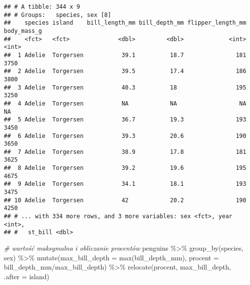 \documentclass[
]{book}
\newenvironment{Shaded}{\begin{snugshade}}{\end{snugshade}}
\newcommand{\AttributeTok}[1]{\textcolor[rgb]{0.77,0.63,0.00}{#1}}
\newcommand{\CommentTok}[1]{\textcolor[rgb]{0.56,0.35,0.01}{\textit{#1}}}
\newcommand{\FunctionTok}[1]{\textcolor[rgb]{0.00,0.00,0.00}{#1}}
\newcommand{\NormalTok}[1]{#1}
\newcommand{\SpecialCharTok}[1]{\textcolor[rgb]{0.00,0.00,0.00}{#1}}
\begin{document}
\begin{verbatim}
## # A tibble: 344 x 9
## # Groups:   species, sex [8]
##    species island    bill_length_mm bill_depth_mm flipper_length_mm body_mass_g
##    <fct>   <fct>              <dbl>         <dbl>             <int>       <int>
##  1 Adelie  Torgersen           39.1          18.7               181        3750
##  2 Adelie  Torgersen           39.5          17.4               186        3800
##  3 Adelie  Torgersen           40.3          18                 195        3250
##  4 Adelie  Torgersen           NA            NA                  NA          NA
##  5 Adelie  Torgersen           36.7          19.3               193        3450
##  6 Adelie  Torgersen           39.3          20.6               190        3650
##  7 Adelie  Torgersen           38.9          17.8               181        3625
##  8 Adelie  Torgersen           39.2          19.6               195        4675
##  9 Adelie  Torgersen           34.1          18.1               193        3475
## 10 Adelie  Torgersen           42            20.2               190        4250
## # ... with 334 more rows, and 3 more variables: sex <fct>, year <int>,
## #   st_bill <dbl>
\end{verbatim}

\begin{Shaded}
\begin{Highlighting}[]
\CommentTok{\# wartość maksymalna i obliczanie procentów}
\NormalTok{penguins }\SpecialCharTok{\%\textgreater{}\%} \FunctionTok{group\_by}\NormalTok{(species, sex) }\SpecialCharTok{\%\textgreater{}\%} \FunctionTok{mutate}\NormalTok{(}\AttributeTok{max\_bill\_depth =} \FunctionTok{max}\NormalTok{(bill\_depth\_mm),}
                                               \AttributeTok{procent =}\NormalTok{ bill\_depth\_mm}\SpecialCharTok{/}\NormalTok{max\_bill\_depth) }\SpecialCharTok{\%\textgreater{}\%}
  \FunctionTok{relocate}\NormalTok{(procent, max\_bill\_depth, }\AttributeTok{.after =}\NormalTok{ island)}
\end{Highlighting}
\end{Shaded}
\end{document}
